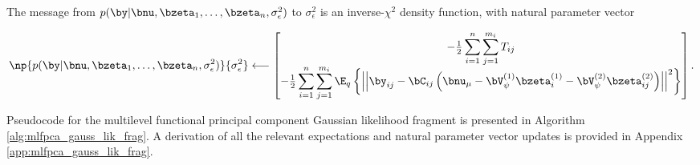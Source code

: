 \documentclass[ba]{imsart}
\numberwithin{equation}{section}
\theoremstyle{plain}
\def\sigsqeps{\sigma^2_{\epsilon}}
\def\numu{\bnu_\mu}
\newcommand\VpsiL[1]{\bV^{(#1)}_{\psi}}
\newcommand\bzetaL[2]{\bzeta^{(#1)}_{#2}}
\begin{document}
The message from $p (\by | \bnu, \bzeta_1, \dots, \bzeta_n, \sigsqeps)$ to $\sigsqeps$
is an inverse-$\chi^2$ density function, with natural parameter vector

\begin{equation}
	\np{p (\by | \bnu, \bzeta_1, \dots, \bzeta_n, \sigsqeps)}{\sigsqeps}
		\longleftarrow
			\begin{bmatrix}
				-\frac12 \displaystyle\sum_{i=1}^n \displaystyle\sum_{j=1}^{m_i} T_{ij} \\
				-\frac12 \displaystyle\sum_{i=1}^n \displaystyle\sum_{j=1}^{m_i} \E_q \left\{ \left| \left|
					\by_{ij} - \bC_{ij} \left(
						\numu - \VpsiL{1} \bzetaL{1}{i} - \VpsiL{2} \bzetaL{2}{ij}
					\right)
				\right| \right|^2 \right\}
			\end{bmatrix}.
\label{np_ml_lik_sigsqeps}
\end{equation}



Pseudocode for the multilevel functional principal component Gaussian likelihood fragment is presented in Algorithm
\ref{alg:mlfpca_gauss_lik_frag}.
A derivation of all the relevant expectations and natural parameter vector updates is provided in Appendix
\ref{app:mlfpca_gauss_lik_frag}.
\end{document}
